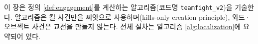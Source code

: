
이 장은 정의 \ref{def:engagement}를 계산하는 알고리즘(코드명 \texttt{teamfight\_v2})을 기술한다. 알고리즘은 킬 사건만을 씨앗으로 사용하며(kills-only creation principle), 와드·오브젝트 사건은 교전을 만들지 않는다. 전체 절차는 알고리즘 \ref{alg:localization}에 요약되어 있다.
